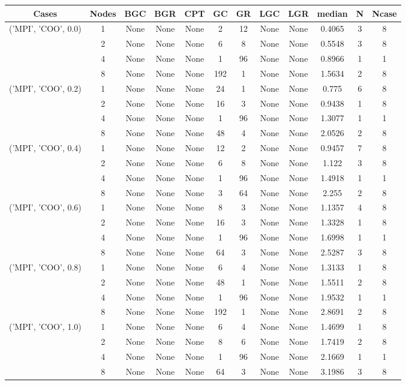 \begin{tabular}{cccccccccccc}
\hline
Cases & Nodes& BGC& BGR& CPT& GC& GR& LGC& LGR& median & N & Ncase \\
\hline
\multirow{4}{*}{('MPI', 'COO', 0.0)}& 1& None& None& None& 2& 12& None& None& 0.4065& 3& 8\\
& 2& None& None& None& 6& 8& None& None& 0.5548& 3& 8\\
& 4& None& None& None& 1& 96& None& None& 0.8966& 1& 1\\
& 8& None& None& None& 192& 1& None& None& 1.5634& 2& 8\\
\hline
\multirow{4}{*}{('MPI', 'COO', 0.2)}& 1& None& None& None& 24& 1& None& None& 0.775& 6& 8\\
& 2& None& None& None& 16& 3& None& None& 0.9438& 1& 8\\
& 4& None& None& None& 1& 96& None& None& 1.3077& 1& 1\\
& 8& None& None& None& 48& 4& None& None& 2.0526& 2& 8\\
\hline
\multirow{4}{*}{('MPI', 'COO', 0.4)}& 1& None& None& None& 12& 2& None& None& 0.9457& 7& 8\\
& 2& None& None& None& 6& 8& None& None& 1.122& 3& 8\\
& 4& None& None& None& 1& 96& None& None& 1.4918& 1& 1\\
& 8& None& None& None& 3& 64& None& None& 2.255& 2& 8\\
\hline
\multirow{4}{*}{('MPI', 'COO', 0.6)}& 1& None& None& None& 8& 3& None& None& 1.1357& 4& 8\\
& 2& None& None& None& 16& 3& None& None& 1.3328& 1& 8\\
& 4& None& None& None& 1& 96& None& None& 1.6998& 1& 1\\
& 8& None& None& None& 64& 3& None& None& 2.5287& 3& 8\\
\hline
\multirow{4}{*}{('MPI', 'COO', 0.8)}& 1& None& None& None& 6& 4& None& None& 1.3133& 1& 8\\
& 2& None& None& None& 48& 1& None& None& 1.5511& 2& 8\\
& 4& None& None& None& 1& 96& None& None& 1.9532& 1& 1\\
& 8& None& None& None& 192& 1& None& None& 2.8691& 2& 8\\
\hline
\multirow{4}{*}{('MPI', 'COO', 1.0)}& 1& None& None& None& 6& 4& None& None& 1.4699& 1& 8\\
& 2& None& None& None& 8& 6& None& None& 1.7419& 2& 8\\
& 4& None& None& None& 1& 96& None& None& 2.1669& 1& 1\\
& 8& None& None& None& 64& 3& None& None& 3.1986& 3& 8\\
\hline
\end{tabular}



